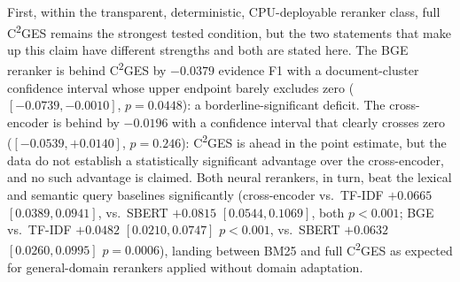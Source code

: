 \documentclass{ieeeaccess}
\begin{document}
\begin{table}[ht]
\centering
\caption{Learned and LLM baselines under the paper's protocol (\(K=3\), 200 questions, same metrics), with paired document-cluster bootstrap comparison against full C\textsuperscript{2}GES (delta = baseline \(-\) C\textsuperscript{2}GES; 10000 samples)}
\label{tab:learned_llm_baselines}
\end{table}

First, within the transparent, deterministic, CPU-deployable reranker class, full C\textsuperscript{2}GES remains the strongest tested condition, but the two statements that make up this claim have different strengths and both are stated here. The BGE reranker is behind C\textsuperscript{2}GES by \(-0.0379\) evidence F1 with a document-cluster confidence interval whose upper endpoint barely excludes zero (\([-0.0739, -0.0010]\), \(p=0.0448\)): a borderline-significant deficit. The cross-encoder is behind by \(-0.0196\) with a confidence interval that clearly crosses zero (\([-0.0539, +0.0140]\), \(p=0.246\)): C\textsuperscript{2}GES is ahead in the point estimate, but the data do not establish a statistically significant advantage over the cross-encoder, and no such advantage is claimed. Both neural rerankers, in turn, beat the lexical and semantic query baselines significantly (cross-encoder vs.\ TF-IDF \(+0.0665\) \([0.0389, 0.0941]\), vs.\ SBERT \(+0.0815\) \([0.0544, 0.1069]\), both \(p<0.001\); BGE vs.\ TF-IDF \(+0.0482\) \([0.0210, 0.0747]\) \(p<0.001\), vs.\ SBERT \(+0.0632\) \([0.0260, 0.0995]\) \(p=0.0006\)), landing between BM25 and full C\textsuperscript{2}GES as expected for general-domain rerankers applied without domain adaptation.
\end{document}
